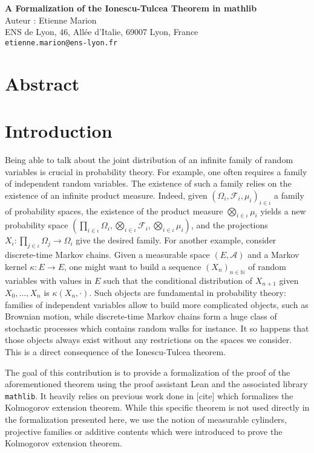 \documentclass{article}
\newcommand{\A}{\mathcal{A}}
\newcommand{\F}{\mathcal{F}}
\newcommand{\N}{\mathbb{N}}
\newcommand{\mathlib}{\texttt{mathlib}}
\theoremstyle{definition}
\theoremstyle{remark}
\begin{document}
	\begin{center}
		{\Large\bf A Formalization of the Ionescu-Tulcea Theorem in mathlib} \\
		\vspace{1cm}
		Auteur : Etienne Marion \\
		\vspace{1cm}
		ENS de Lyon, 46, Allée d’Italie, 69007 Lyon, France \\
		\texttt{etienne.marion@ens-lyon.fr}
	\end{center}

	\vspace{0.5cm}

	\section*{Abstract}

	\section{Introduction}
	Being able to talk about the joint distribution of an infinite family of random variables is crucial in probability theory. For example, one often requires a family of independent random variables. The existence of such a family relies on the existence of an infinite product measure. Indeed, given $(\Omega_i, \F_i, \mu_i)_{i\in\iota}$ a family of probability spaces, the existence of the product measure $\bigotimes_{i\in\iota}\mu_i$ yields a new probability space $(\prod_{i\in\iota}\Omega_i, \bigotimes_{i\in\iota}\F_i, \bigotimes_{i\in\iota}\mu_i)$, and the projections $X_i : \prod_{j\in\iota}\Omega_j \to \Omega_i$ give the desired family. For another example, consider discrete-time Markov chains. Given a measurable space $(E, \A)$ and a Markov kernel $\kappa : E \to E$, one might want to build a sequence $(X_n)_{n\in\N}$ of random variables with values in $E$ such that the conditional distribution of $X_{n+1}$ given $X_0, ..., X_n$ is $\kappa(X_n,\cdot)$. Such objects are fundamental in probability theory: families of independent variables allow to build more complicated objects, such as Brownian motion, while discrete-time Markov chains form a huge class of stochastic processes which contains random walks for instance. It so happens that those objects always exist without any restrictions on the spaces we consider. This is a direct consequence of the Ionescu-Tulcea theorem.

	The goal of this contribution is to provide a formalization of the proof of the aforementioned theorem using the proof assistant Lean and the associated library \mathlib. It heavily relies on previous work done in [cite] which formalizes the Kolmogorov extension theorem. While this specific theorem is not used directly in the formalization presented here, we use the notion of measurable cylinders, projective families or additive contents which were introduced to prove the Kolmogorov extension theorem.
\end{document}
